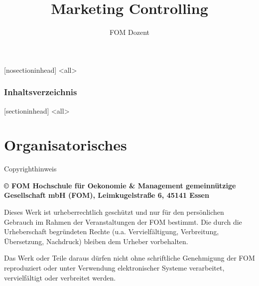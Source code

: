 \documentclass[12pt,ngerman,a4paper,ignorenonframetext,]{beamer}
\title{Marketing Controlling}
\author{FOM Dozent}
\institute{FOM}
\date{}
\begin{document}
\frame{\titlepage}


%
%
  [nosectioninhead]
\mode<all>
\begin{frame}
  \frametitle{Inhaltsverzeichnis}
  \flushcolumns %
  \setlength{\columnsep}{0.2cm}%
  \begin{multicols}{2}
    \tableofcontents[hideallsubsections]
  \end{multicols}
\end{frame}
  [sectioninhead]
\mode<all>

%
%

\hypertarget{organisatorisches}{%
\section{Organisatorisches}\label{organisatorisches}}

\begin{frame}{Copyrighthinweis}
\protect\hypertarget{copyrighthinweis}{}

\textbf{© FOM Hochschule für Oekonomie \& Management gemeinnützige
Gesellschaft mbH (FOM), Leimkugelstraße 6, 45141 Essen}

Dieses Werk ist urheberrechtlich geschützt und nur für den persönlichen
Gebrauch im Rahmen der Veranstaltungen der FOM bestimmt. Die durch die
Urheberschaft begründeten Rechte \mbox{(u.\thinspace{}a.}\xspace{}
Vervielfältigung, Verbreitung, Übersetzung, Nachdruck) bleiben dem
Urheber vorbehalten.

Das Werk oder Teile daraus dürfen nicht ohne schriftliche Genehmigung
der FOM reproduziert oder unter Verwendung elektronischer Systeme
verarbeitet, vervielfältigt oder verbreitet werden.

\end{frame}
\end{document}
